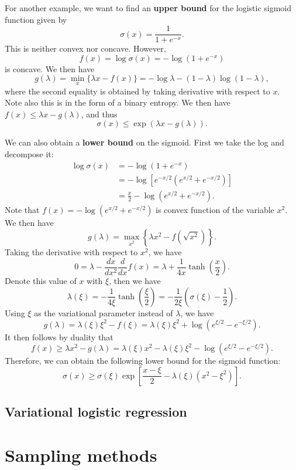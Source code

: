 \documentclass[a4paper]{article}
\begin{document}
\begin{eg}
For another example, we want to find an \textbf{upper 
bound} for the logistic sigmoid function given by
\[
\sigma(x) = \frac{1}{1 + e^{-x}}.
\]
This is neither convex nor concave. However, 
\[
f(x) = \log \sigma(x) = - \log (1 + e^{-x})
\]
is concave. We then have 
\[
g(\lambda) = \min_x \{\lambda x - f(x)\}
= - \log \lambda - (1 - \lambda) \log (1 - \lambda),
\]
where the second equality is obtained by taking derivative 
with respect to $x$. Note also this is in the form of 
a binary entropy. We then have $f(x) \leq \lambda x - g(\lambda)$,
and thus
\[
\sigma(x) \leq \exp (\lambda x - g (\lambda)).
\]

We can also obtain a \textbf{lower bound} on the sigmoid.
First we take the log and decompose it:
\[
\begin{aligned}
\log \sigma(x) 
&= - \log (1 + e^{-x}) \\
&= - \log \left[ e^{-x / 2} (e^{x / 2} + 
e^{-x / 2}) \right] \\
&= \frac{x}{2} - \log (e^{x / 2} + e^{- x / 2}).
\end{aligned}
\]
Note that $f(x) = - \log (e^{x / 2} + e^{- x / 2})$ is 
convex function of the variable $x^2$. We then have 
\[
g(\lambda) = \max_{x^2} \left\{ \lambda x^2 - f \left( 
  \sqrt{x^2} \right) \right\}.
\]
Taking the derivative with respect to $x^2$, we have 
\[
0 = \lambda - \frac{d x}{d x^2} \frac{d}{d x} 
f(x) = \lambda + \frac{1}{4x} \tanh \left( \frac{x}{2} 
\right).
\]
Denote this value of $x$ with $\xi$, then we have 
\[
\lambda (\xi) 
= - \frac{1}{4 \xi} \tanh \left( \frac{\xi}{2} \right) 
= - \frac{1}{2 \xi} \left( \sigma(\xi) - \frac{1}{2} \right).
\]
Using $\xi$ as the variational parameter instead of 
$\lambda$, we have 
\[
g(\lambda) = \lambda(\xi) \xi^2 - f(\xi)
= \lambda(\xi) \xi^2 + \log (e^{\xi / 2} - e^{- \xi / 2}).
\]
It then follows by duality that 
\[
f(x) \geq \lambda x^2 - g(\lambda)
= \lambda(\xi) x^2 - \lambda(\xi) \xi^2 
- \log (e^{\xi / 2} - e^{- \xi / 2}).
\]
Therefore, we can obtain the following lower bound for the 
sigmoid function: 
\[
\sigma(x) \geq \sigma(\xi) 
\exp \left[ \frac{x - \xi}{2} - \lambda(\xi) (x^2 - \xi^2) 
\right].
\]
\end{eg}

\subsection{Variational logistic regression}


\section{Sampling methods}
\end{document}

